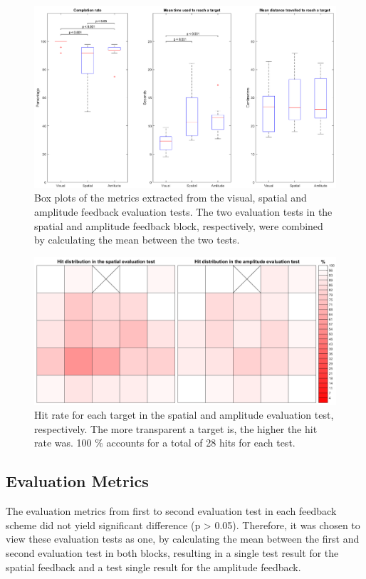 \begin{figure}[t]                 
	\includegraphics[width=.8\textwidth]{figures/boxplot_results}
	\caption{Box plots of the metrics extracted from the visual, spatial and amplitude feedback evaluation tests. The two evaluation tests in the spatial and amplitude feedback block, respectively, were combined by calculating the mean between the two tests.}
	\label{fig:pa:boxplot_results} 
\end{figure}

\begin{figure}[t]                 
	\includegraphics[width=.8\textwidth]{figures/hit_dist}
	\caption{Hit rate for each target in the spatial and amplitude evaluation test, respectively. The more transparent a target is, the higher the hit rate was. 100 $\%$ accounts for a total of 28 hits for each test.}
	\label{fig:pa:hit_dist} 
\end{figure}


\subsection{Evaluation Metrics}
The evaluation metrics from first to second evaluation test in each feedback scheme did not yield significant difference (p > 0.05). Therefore, it was chosen to view these evaluation tests as one, by calculating the mean between the first and second evaluation test in both blocks, resulting in a single test result for the spatial feedback and a test single result for the amplitude feedback. 

